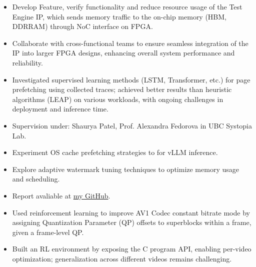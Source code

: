 \documentclass[10pt,a4paper,ragged2e,withhyper]{altacv}
\begin{document}
\begin{paracol}{2}

\begin{itemize}
  \item Develop Feature, verify functionality and reduce resource usage of the Test Engine IP, which sends memory traffic to the on-chip memory (HBM, DDRRAM) through NoC interface on FPGA.
  \item Collaborate with cross-functional teams to ensure seamless integration of the IP into larger FPGA designs, enhancing overall system performance and reliability.
\end{itemize}

\divider

\begin{itemize}
\item Investigated supervised learning methods (LSTM, Transformer, etc.) for page prefetching using collected traces; achieved better results than heuristic algorithms (LEAP) on various workloads, with ongoing challenges in deployment and inference time.
\item Supervision under: Shaurya Patel, Prof. Alexandra Fedorova in UBC Systopia Lab.
\end{itemize}


\begin{itemize}
  \item Experiment OS cache prefetching strategies to for vLLM inference.
  \item Explore adaptive watermark tuning techniques to optimize memory usage and scheduling.
  \item Report avaliable at \href{https://luckunately.github.io/courses/CPEN511/Final_report.pdf}{\faGithub my GitHub}. 
\end{itemize}

\divider

\begin{itemize}
  \item Used reinforcement learning to improve AV1 Codec constant bitrate mode by assigning Quantization Parameter (QP) offsets to superblocks within a frame, given a frame-level QP.
  \item Built an RL environment by exposing the C program API, enabling per-video optimization; generalization across different videos remains challenging.
\end{itemize}


\end{paracol}
\end{document}
